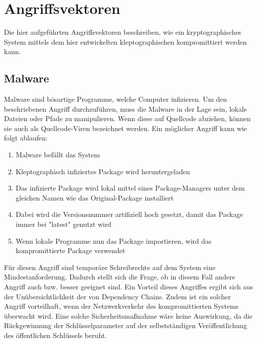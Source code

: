     \section{Angriffsvektoren}
        Die hier aufgeführten Angriffsvektoren beschreiben, wie ein kryptographisches System mittels dem hier entwickelten kleptographischen kompromittiert werden kann.

        \subsection{Malware}
            Malware sind bösartige Programme, welche Computer infizieren. Um den beschriebenen Angriff durchzuführen, muss die Malware in der Lage sein, lokale Dateien oder Pfade zu manipulieren. Wenn diese auf Quellcode abziehen, können sie auch als Quellcode-Viren bezeichnet werden. Ein möglicher Angriff kann wie folgt ablaufen:
            \begin{enumerate}
                \item Malware befällt das System
                \item Kleptographisch infiziertes Package wird heruntergeladen
                \item Das infizierte Package wird lokal mittel eines Package-Managers unter dem gleichen Namen wie das Original-Package installiert
                \item Dabei wird die Versionsnummer artifiziell hoch gesetzt, damit das Package immer bei "latest" genutzt wird
                \item Wenn lokale Programme nun das Package importieren, wird das kompromittierte Package verwendet
            \end{enumerate}
            Für diesen Angriff sind temporäre Schreibrechte auf dem System eine Mindestanforderung. Dadurch stellt sich die Frage, ob in diesem Fall andere Angriff auch bzw. besser geeignet sind. Ein Vorteil dieses Angriffes ergibt sich aus der Unübersichtlichkeit der von Dependency Chains. Zudem ist ein solcher Angriff vorteilhaft, wenn der Netzwerkverkehr des kompromittierten Systems überwacht wird. Eine solche Sicherheitsmaßnahme wäre keine Auswirkung, da die Rückgewinnung der Schlüsselparameter auf der selbstständigen Veröffentlichung des öffentlichen Schlüssels beruht.

